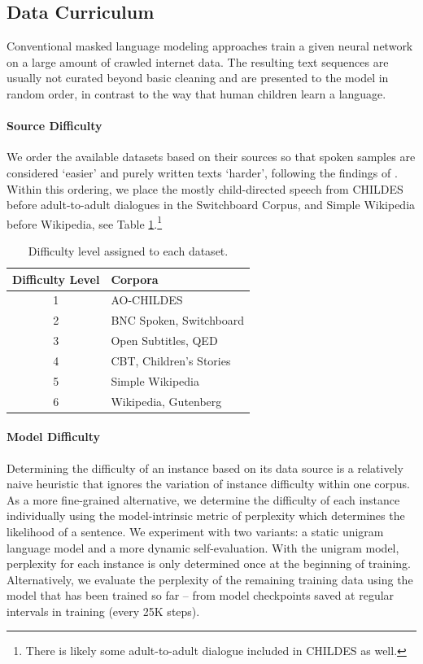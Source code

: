 \subsection{Data Curriculum}
\label{subsec:data-cl}

Conventional masked language modeling approaches train a given neural network on a large amount of crawled internet data. The resulting text sequences are usually not curated beyond basic cleaning and are presented to the model in random order, in contrast to the way that human children learn a language.
 

\paragraph{Source Difficulty} We order the available datasets based on their sources so that spoken samples are considered `easier' and purely written texts `harder', following the findings of \citet{huebner2021babyberta}. Within this ordering, we place the mostly child-directed speech from CHILDES before adult-to-adult dialogues in the Switchboard Corpus, and Simple Wikipedia before Wikipedia, see Table \ref{tbl:source_order}.\footnote{There is likely some adult-to-adult dialogue included in CHILDES as well.}

\begin{table}
\centering
\small
\begin{tabular}{cl}
\toprule
Difficulty Level & Corpora \\
\midrule
1 & AO-CHILDES\\
2 & BNC Spoken, Switchboard \\
3 & Open Subtitles, QED \\
4 & CBT, Children's Stories \\
5 & Simple Wikipedia \\
6 & Wikipedia, Gutenberg \\
\bottomrule
\end{tabular}
\caption{\label{tbl:source_order} Difficulty level assigned to each dataset.}
\end{table}

\paragraph{Model Difficulty}
Determining the difficulty of an instance based on its data source is a relatively naive heuristic that ignores the variation of instance difficulty within one corpus. As a more fine-grained alternative, we determine the difficulty of each instance individually using the model-intrinsic metric of perplexity which determines the likelihood of a sentence. We experiment with two variants: a static unigram language model and a more dynamic self-evaluation. With the unigram model, perplexity for each instance is only determined once at the beginning of training. Alternatively, we evaluate the perplexity of the remaining training data using the model that has been trained so far -- from model checkpoints saved at regular intervals in training (every 25K steps). 


